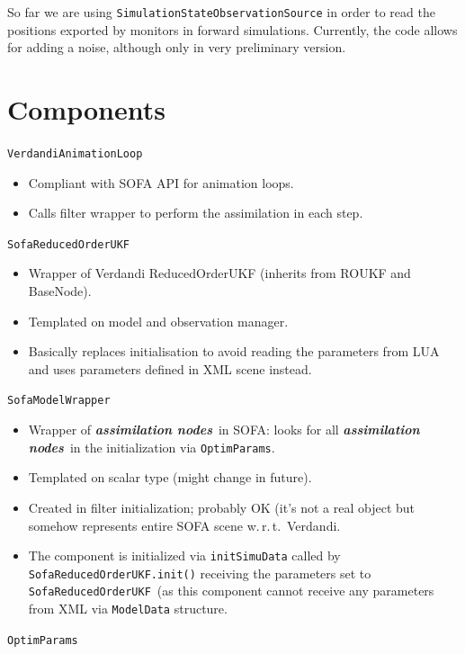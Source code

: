 \documentclass[10pt]{article}
\def\wrt{w.\,r.\,t.}
\def\asns{\textit{\textbf{assimilation nodes}}}
\def\veal{\texttt{VerdandiAnimationLoop}}
\def\sroukf{\texttt{SofaReducedOrderUKF}}
\def\smw{\texttt{SofaModelWrapper}}
\def\opr{\texttt{OptimParams}}
\begin{document}
So far we are using \texttt{SimulationStateObservationSource} in order to read the positions exported by monitors in forward simulations. Currently,
the code allows for adding a noise, although 
only in very preliminary version.

\section{Components}
{\large \veal}
\begin{itemize}
\item Compliant with SOFA API for animation loops. 
\item Calls filter wrapper to perform the assimilation in each step.
\end{itemize}
\medskip
{\large \sroukf}
\begin{itemize}
\item Wrapper of Verdandi ReducedOrderUKF (inherits from ROUKF and BaseNode).
\item Templated on model and observation manager.
\item Basically replaces initialisation to avoid reading the parameters from LUA and uses parameters defined in XML scene instead. 
\end{itemize}
\medskip
{\large\smw}
\begin{itemize}
\item Wrapper of \asns\ in SOFA: looks for all \asns\ in the initialization via \opr.
\item Templated on scalar type (might change in future).
\item Created in filter initialization; probably OK (it's not a real object but somehow represents entire SOFA scene \wrt\ Verdandi.
\item The component is initialized via \texttt{initSimuData} called by \sroukf\texttt{.init()} receiving the parameters set to \sroukf\ (as this
component cannot 
receive any parameters from XML via \texttt{ModelData} structure.
\end{itemize}
\medskip
{\large\opr}
\end{document}

